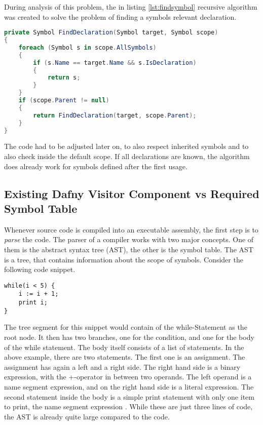 During analysis of this problem, the in listing \ref{lst:findsymbol} recursive algorithm was created
to solve the problem of finding a symbols relevant declaration.

\begin{lstlisting}[language=csharp, caption={Finding Symbol Definition}, captionpos=b, label={lst:findsymbol}]
private Symbol FindDeclaration(Symbol target, Symbol scope)
{
    foreach (Symbol s in scope.AllSymbols)
    {
        if (s.Name == target.Name && s.IsDeclaration)
        {
            return s;
        }
    }
    if (scope.Parent != null)
    {
        return FindDeclaration(target, scope.Parent);
    }
}
\end{lstlisting}
The code had to be adjusted later on, to also respect inherited symbols and to also check inside the default scope.
If all declarations are known, the algorithm does already work for symbols defined after the first usage.

\subsection{Existing Dafny Visitor Component vs Required Symbol Table}
Whenever source code is compiled into an executable assembly, the first step is to \textit{parse} the code.
The parser of a compiler works with two major concepts.
One of them is the abstract syntax tree (AST), the other is the symbol table. 
The AST is a tree, that contains information about the scope of symbols.
Consider the following code snippet.

\begin{lstlisting}[language=dafny, caption={AST Demo Snippet}, captionpos=b, label={lst:astsnipped}]
while(i < 5) {
    i := i + 1;
    print i;
}
\end{lstlisting}

The tree segment for this snippet would contain of the while-Statement as the root node.
It then has two branches, one for the condition, and one for the body of the while statement.
The body itself consists of a list of statements.
In the above example, there are two statements.
The first one is an assignment.
The assignment has again a left and a right side.
The right hand side is a binary expression, with the +-operator in between two operands.
The left operand is a name segment expression, and on the right hand side is a literal expression.
The second statement inside the body is a simple print statement with only one item to print, the name segment expression .
While these are just three lines of code, the AST is already quite large compared to the code.\\


